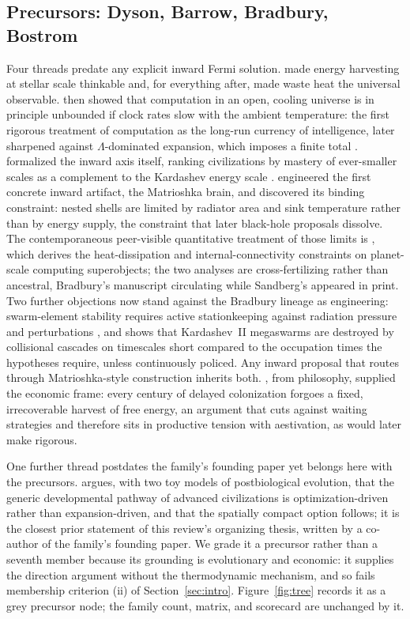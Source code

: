 \documentclass[11pt]{article}
\begin{document}
\subsection{Precursors: Dyson, Barrow, Bradbury, Bostrom}
\label{sec:precursors}

Four threads predate any explicit inward Fermi solution. \citet{Dyson1960} made energy harvesting at stellar scale thinkable and, for everything after, made waste heat the universal observable. \citet{Dyson1979} then showed that computation in an open, cooling universe is in principle unbounded if clock rates slow with the ambient temperature: the first rigorous treatment of computation as the long-run currency of intelligence, later sharpened against $\Lambda$-dominated expansion, which imposes a finite total \citep{KraussStarkman2000}. \citet{Barrow1998} formalized the inward axis itself, ranking civilizations by mastery of ever-smaller scales as a complement to the Kardashev energy scale \citep{Kardashev1964}. \citet{Bradbury1999} engineered the first concrete inward artifact, the Matrioshka brain, and discovered its binding constraint: nested shells are limited by radiator area and sink temperature rather than by energy supply, the constraint that later black-hole proposals dissolve. The contemporaneous peer-visible quantitative treatment of those limits is \citet{Sandberg1999}, which derives the heat-dissipation and internal-connectivity constraints on planet-scale computing superobjects; the two analyses are cross-fertilizing rather than ancestral, Bradbury's manuscript circulating while Sandberg's appeared in print. Two further objections now stand against the Bradbury lineage as engineering: swarm-element stability requires active stationkeeping against radiation pressure and perturbations \citep{Wright2020}, and \citet{Lacki2025Cascade} shows that Kardashev~II megaswarms are destroyed by collisional cascades on timescales short compared to the occupation times the hypotheses require, unless continuously policed. Any inward proposal that routes through Matrioshka-style construction inherits both. \citet{Bostrom2003}, from philosophy, supplied the economic frame: every century of delayed colonization forgoes a fixed, irrecoverable harvest of free energy, an argument that cuts against waiting strategies and therefore sits in productive tension with aestivation, as \citet{Bennett2019} would later make rigorous.

One further thread postdates the family's founding paper yet belongs here with the precursors. \citet{Cirkovic2008} argues, with two toy models of postbiological evolution, that the generic developmental pathway of advanced civilizations is optimization-driven rather than expansion-driven, and that the spatially compact option follows; it is the closest prior statement of this review's organizing thesis, written by a co-author of the family's founding paper. We grade it a precursor rather than a seventh member because its grounding is evolutionary and economic: it supplies the direction argument without the thermodynamic mechanism, and so fails membership criterion (ii) of Section~\ref{sec:intro}. Figure~\ref{fig:tree} records it as a grey precursor node; the family count, matrix, and scorecard are unchanged by it.
\end{document}
